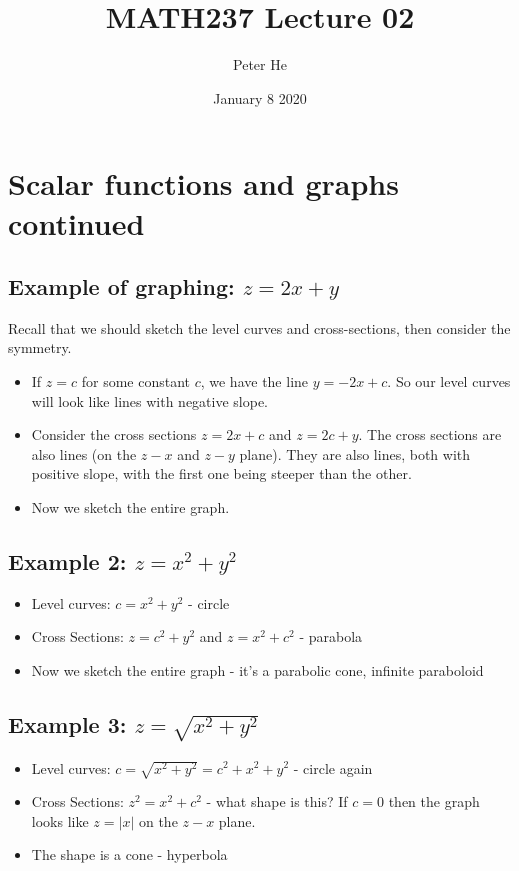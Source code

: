 \documentclass[12pt]{article}
\title{MATH237 Lecture 02}
\author{Peter He}
\date{January 8 2020}
\begin{document}
\maketitle

\section{Scalar functions and graphs continued}
\subsection{Example of graphing: $z=2x+y$}

Recall that we should sketch the level curves and cross-sections, then consider the symmetry.
\begin{itemize}
    \item If $z=c$ for some constant $c$, we have the line $y=-2x+c$. So our level curves will look like lines with negative slope.
    \item Consider the cross sections $z=2x+c$ and $z=2c+y$. The cross sections are also lines (on the $z-x$ and $z-y$ plane). They are also lines, both with positive slope, with the first one being steeper than the other.
    \item Now we sketch the entire graph.
\end{itemize}

\subsection{Example 2: $z=x^2+y^2$}
\begin{itemize}
    \item Level curves: $c=x^2+y^2$ - circle
    \item Cross Sections: $z=c^2+y^2$ and $z=x^2+c^2$ - parabola
    \item Now we sketch the entire graph - it's a parabolic cone, infinite paraboloid
\end{itemize}

\subsection{Example 3: $z=\sqrt{x^2+y^2}$}
\begin{itemize}
    \item Level curves: $c=\sqrt{x^2+y^2}=c^2+x^2+y^2$ - circle again
    \item Cross Sections: $z^2 = x^2+c^2$ - what shape is this? If $c=0$ then the graph looks like $z=|x|$ on the $z-x$ plane.
    \item The shape is a cone - hyperbola
\end{itemize}
\end{document}
